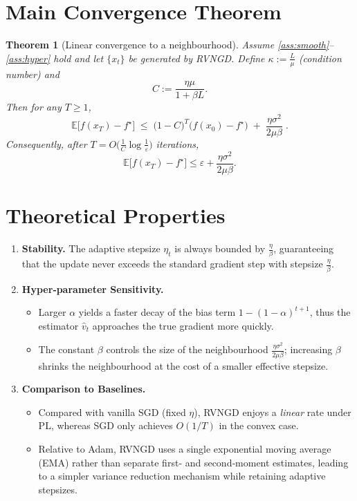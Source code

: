 \documentclass{article}
\newtheorem{theorem}{Theorem}
\newcommand{\E}{\mathbb{E}}
\begin{document}
\section*{Main Convergence Theorem}
\begin{theorem}[Linear convergence to a neighbourhood]\label{thm:main}
Assume \ref{ass:smooth}–\ref{ass:hyper} hold and let $\{x_t\}$ be generated by RVNGD.
Define $\kappa:=\frac{L}{\mu}$ (condition number) and
\[
    C:=\frac{\eta\mu}{1+\beta L}.
\]
Then for any $T\ge1$,
\begin{equation}
    \E\!\bigl[f(x_T)-f^\star\bigr]
    \;\le\;
    \bigl(1-C\bigr)^T\!\bigl(f(x_0)-f^\star\bigr)
    \;+\;
    \frac{\eta\sigma^2}{2\mu\beta}\; .
    \tag{5}
\end{equation}
Consequently, after $T=O\!\bigl(\frac{1}{C}\log\frac{1}{\varepsilon}\bigr)$ iterations,
\[
    \E\!\bigl[f(x_T)-f^\star\bigr]\le\varepsilon+\frac{\eta\sigma^2}{2\mu\beta}.
\]
\end{theorem}

\section*{Theoretical Properties}
\begin{enumerate}[label=\arabic*.]
    \item \textbf{Stability.} The adaptive stepsize $\eta_t$ is always bounded by $\frac{\eta}{\beta}$, guaranteeing that the update never exceeds the standard gradient step with stepsize $\frac{\eta}{\beta}$.
    \item \textbf{Hyper‑parameter Sensitivity.}
    \begin{itemize}
        \item Larger $\alpha$ yields a faster decay of the bias term $1-(1-\alpha)^{t+1}$, thus the estimator $\hat v_t$ approaches the true gradient more quickly.
        \item The constant $\beta$ controls the size of the neighbourhood $\frac{\eta\sigma^2}{2\mu\beta}$; increasing $\beta$ shrinks the neighbourhood at the cost of a smaller effective stepsize.
    \end{itemize}
    \item \textbf{Comparison to Baselines.}
    \begin{itemize}
        \item Compared with vanilla SGD (fixed $\eta$), RVNGD enjoys a \emph{linear} rate under PL, whereas SGD only achieves $O(1/T)$ in the convex case.
        \item Relative to Adam, RVNGD uses a single exponential moving average (EMA) rather than separate first‑ and second‑moment estimates, leading to a simpler variance reduction mechanism while retaining adaptive stepsizes.
    \end{itemize}
\end{enumerate}
\end{document}
